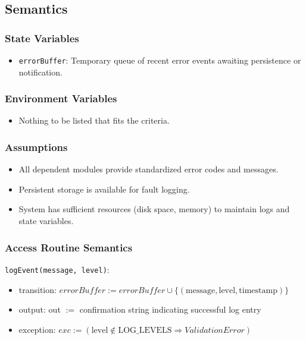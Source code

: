 \documentclass[12pt, titlepage]{article}
\begin{document}
\subsection{Semantics}

\subsubsection{State Variables}
\begin{itemize}
    \item \texttt{errorBuffer}: Temporary queue of recent error events awaiting persistence or notification.
\end{itemize}

\subsubsection{Environment Variables}
\begin{itemize}
    \item Nothing to be listed that fits the criteria.
\end{itemize}

\subsubsection{Assumptions}
\begin{itemize}
    \item All dependent modules provide standardized error codes and messages.
    \item Persistent storage is available for fault logging.
    \item System has sufficient resources (disk space, memory) to maintain logs and state variables.
\end{itemize}

\subsubsection{Access Routine Semantics}

\noindent \texttt{logEvent(message, level)}:
\begin{itemize}
\item transition: $errorBuffer := errorBuffer \cup \{(\text{message}, \text{level}, \text{timestamp})\}$
\item output: out $:=$ confirmation string indicating successful log entry
\item exception: $exc := (\text{level} \notin \text{LOG\_LEVELS} \Rightarrow ValidationError)$
\end{itemize}
\end{document}
